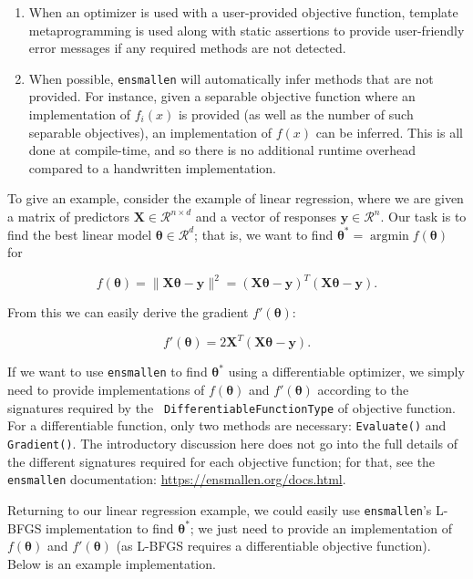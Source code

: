\begin{enumerate}
  \item When an optimizer is used with a user-provided objective function,
template metaprogramming is used along with static assertions to provide
user-friendly error messages if any required methods are not detected.

  \item When possible, {\tt ensmallen} will automatically infer methods that are
not provided.  For instance, given a separable objective function where an
implementation of $f_i(x)$ is provided (as well as the number of such separable
objectives), an implementation of $f(x)$ can be inferred.  This is all done at
compile-time, and so there is no additional runtime overhead compared to a
handwritten implementation.
\end{enumerate}

To give an example, consider the example of linear regression, where we are
given a matrix of predictors $\bm X \in \mathcal{R}^{n \times d}$ and a vector
of responses $\bm y \in \mathcal{R}^n$.  Our task is to find the best linear
model $\bm \theta \in \mathcal{R}^d$; that is, we want to find $\bm \theta^* =
\operatorname{argmin} f(\bm \theta)$ for

\begin{equation}
f(\bm \theta) = \| \bm X \bm \theta - \bm y \|^2 = (\bm X \bm \theta - \bm y)^T
(\bm X \bm \theta - \bm y).
\label{eqn:obj_lr}
\end{equation}

From this we can easily derive the gradient $f'(\bm \theta)$:

\begin{equation}
f'(\bm \theta) = 2 \bm X^T (\bm X \bm \theta - \bm y).
\label{eqn:grad_lr}
\end{equation}

If we want to use {\tt ensmallen} to find $\bm \theta^*$ using a differentiable
optimizer, we simply need to provide implementations of $f(\bm \theta)$ and
$f'(\bm \theta)$ according to the signatures required by the {\tt
DifferentiableFunctionType} of objective function.  For a differentiable
function, only two methods are necessary: {\tt Evaluate()} and {\tt Gradient()}.
The introductory discussion here does not go into the full details of the
different signatures required for each objective function; for that, see the
{\tt ensmallen} documentation: \url{https://ensmallen.org/docs.html}.

Returning to our linear regression example, we could easily use {\tt ensmallen}'s
L-BFGS implementation to find $\bm \theta^*$; we just need to provide an
implementation of $f(\bm \theta)$ and $f'(\bm \theta)$ (as L-BFGS requires a
differentiable objective function).  Below is an example implementation.

